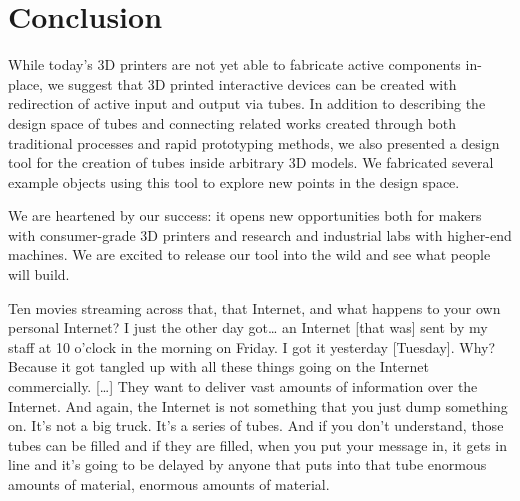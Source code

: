 \section{Conclusion}
While today's 3D printers are not yet able to fabricate active components in-place, we suggest that 3D printed interactive devices can be created with redirection of active input and output via tubes.  In addition to describing the design space of tubes and connecting related works created through both traditional processes and rapid prototyping methods, we also presented a design tool for the creation of tubes inside arbitrary 3D models.  We fabricated several example objects using this tool to explore new points in the design space.

We are heartened by our success: it opens new opportunities both for makers with consumer-grade 3D printers and research and industrial labs with higher-end machines.  We are excited to release our tool into the wild and see what people will build.

Ten movies streaming across that, that Internet, and what happens to your own personal Internet? I just the other day got… an Internet [that was] sent by my staff at 10 o'clock in the morning on Friday. I got it yesterday [Tuesday]. Why? Because it got tangled up with all these things going on the Internet commercially.
[…] They want to deliver vast amounts of information over the Internet. And again, the Internet is not something that you just dump something on. It's not a big truck. It's a series of tubes. And if you don't understand, those tubes can be filled and if they are filled, when you put your message in, it gets in line and it's going to be delayed by anyone that puts into that tube enormous amounts of material, enormous amounts of material.
